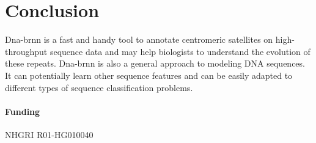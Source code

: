 \documentclass{bioinfo}
\begin{document}
\section{Conclusion}

Dna-brnn is a fast and handy tool to annotate centromeric satellites on
high-throughput sequence data and may help biologists to understand the
evolution of these repeats. Dna-brnn is also a general approach to modeling DNA
sequences. It can potentially learn other sequence features and can be easily
adapted to different types of sequence classification problems.

\paragraph{Funding\textcolon} NHGRI R01-HG010040


\end{document}
